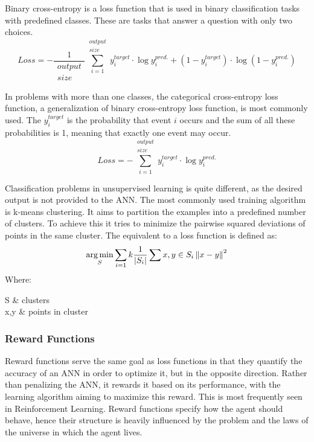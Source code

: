 Binary cross-entropy is a loss function that is used in binary classification tasks with predefined classes. These are tasks that answer a question with only two choices.
\begin{equation}
    	Loss = - 
    	\frac{1}{ \substack{ output\\ size } }
    	\sum_{i=1}^{ \substack{ output\\ size } }
    	y_i^{target} \cdot \log y_i^{pred.} + 
    	\left( 1 - y_i^{target} \right) \cdot
    	\log \left( 1 - y_i^{pred.} \right)
    	\label{eqn:Binary cross-entropy}
\end{equation}

In problems with more than one classes, the categorical cross-entropy loss function, a generalization of binary cross-entropy loss function, is most commonly used. The \( y_i^{target}\) is the probability that event \( i \) occurs and the sum of all these probabilities is 1, meaning that exactly one event may occur.
\begin{equation}
    	Loss = 
    	- \sum_{i=1}^{ \substack{ output\\ size } }
    	y_i^{target} \cdot \log y_i^{pred.}
    	\label{eqn:Categorical cross-entropy}
\end{equation}

Classification problems in unsupervised learning is quite different, as the desired output is not provided to the ANN. The most commonly used training algorithm is k-means clustering. It aims to partition the examples into a predefined number of clusters. To achieve this it tries to minimize the pairwise squared deviations of points in the same cluster. The equivalent to a loss function is defined as:
\begin{equation}
	\operatorname*{arg\,min}_S \sum_{i=1}{k} \frac{1}{ \left| S_i \right| } \sum_{}{x,y \in S_i} \left\| x-y \right\|^2
	\label{eqn:k-means error}
\end{equation}
Where:
\begin{conditions}
    S & clusters\\
    x,y & points in cluster\\
\end{conditions}

\subsubsection{Reward Functions}
Reward functions serve the same goal as loss functions in that they quantify the accuracy of an ANN in order to optimize it, but in the opposite direction. Rather than penalizing the ANN, it rewards it based on its performance, with the learning algorithm aiming to maximize this reward. This is most frequently seen in Reinforcement Learning. Reward functions specify how the agent should behave, hence their structure is heavily influenced by the problem and the laws of the universe in which the agent lives. 

